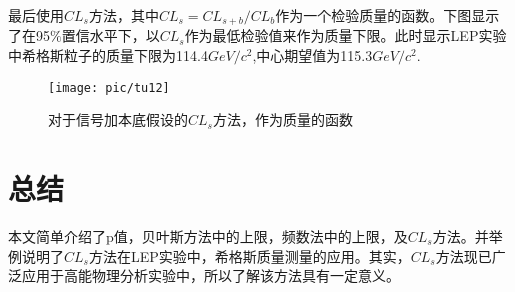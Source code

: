 最后使用$CL_{s}$方法，其中$CL_{s}=CL_{s+b}/CL_{b}$作为一个检验质量的函数。下图显示了在95$\%$置信水平下，以$CL_{s}$作为最低检验值来作为质量下限。此时显示LEP实验中希格斯粒子的质量下限为114.4$GeV/c^{2}$,中心期望值为115.3$GeV/c^{2}$.

\begin{figure}[ht]
	\centering
	\texttt{[image: pic/tu12]}
	\caption{对于信号加本底假设的$CL_{s}$方法，作为质量的函数}
	\label{fig:12}
\end{figure}

\section{总结}

本文简单介绍了p值，贝叶斯方法中的上限，频数法中的上限，及$CL_{s}$方法。并举例说明了$CL_{s}$方法在LEP实验中，希格斯质量测量的应用。其实，$CL_{s}$方法现已广泛应用于高能物理分析实验中，所以了解该方法具有一定意义。
